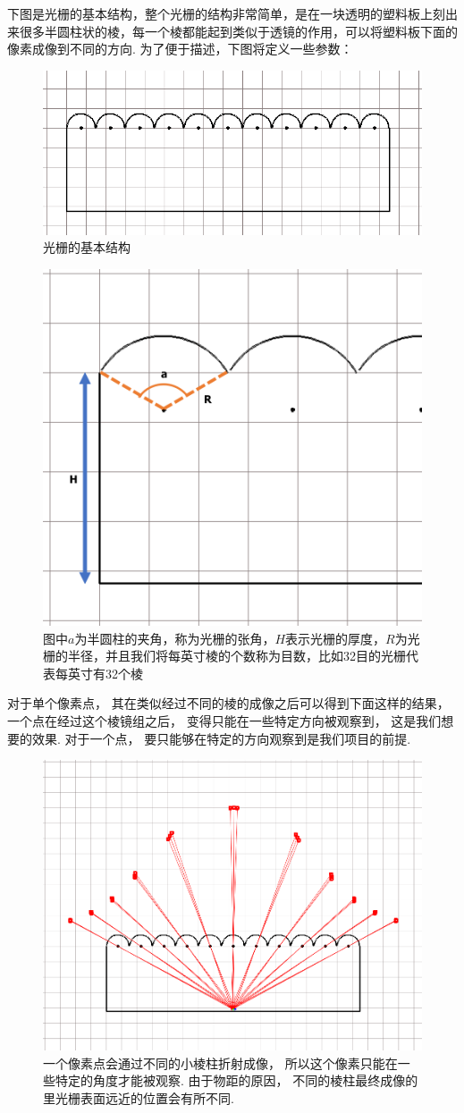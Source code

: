 \documentclass[12pt,a4paper]{article}
\begin{document}
下图是光栅的基本结构，整个光栅的结构非常简单，是在一块透明的塑料板上刻出来很多半圆柱状的棱，每一个棱都能起到类似于透镜的作用，可以将塑料板下面的像素成像到不同的方向. 为了便于描述，下图将定义一些参数：
\begin{figure}[h!]
    \centering\includegraphics[width=0.6\linewidth]{226}
    \caption{光栅的基本结构}
\end{figure}
\begin{figure}[h!]
    \centering\includegraphics[width=0.6\linewidth]{227}
    \caption{图中$a$为半圆柱的夹角，称为光栅的张角，$H$表示光栅的厚度，$R$为光栅的半径，并且我们将每英寸棱的个数称为目数，比如32目的光栅代表每英寸有32个棱}
\end{figure}

对于单个像素点， 其在类似经过不同的棱的成像之后可以得到下面这样的结果， 一个点在经过这个棱镜组之后， 变得只能在一些特定方向被观察到， 这是我们想要的效果. 对于一个点， 要只能够在特定的方向观察到是我们项目的前提.
\begin{figure}[h!]
    \centering\includegraphics[width=0.8\linewidth]{249}
    \caption{一个像素点会通过不同的小棱柱折射成像， 所以这个像素只能在一些特定的角度才能被观察. 由于物距的原因， 不同的棱柱最终成像的里光栅表面远近的位置会有所不同.}
\end{figure}
\end{document}
